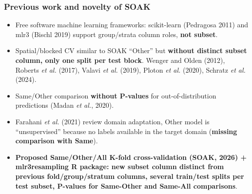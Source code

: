 \documentclass[t,aspectratio=1610]{beamer}
\begin{document}
\begin{frame}
  \frametitle{Previous work and novelty of SOAK}
  \begin{itemize}
  \item Free software machine learning frameworks: scikit-learn (Pedragosa 2011) and mlr3 (Bischl 2019) support group/strata column roles, \textbf{not subset}.
  \item Spatial/blocked CV similar to SOAK ``Other'' but \textbf{without distinct subset column, only one split per test block}.
    Wenger and Olden (2012), Roberts \emph{et al.} (2017), Valavi \emph{et al.} (2019), Ploton \emph{et al.} (2020), Schratz \emph{et al.} (2024).
  \item Same/Other comparison \textbf{without P-values} for
    out-of-distribution predictions 
    (Madan \emph{et al.}, 2020).
  \item Farahani \emph{et al.} (2021) review domain
      adaptation,
      Other model is ``unsupervised'' because no labels available in the target domain (\textbf{missing comparison with Same}).
  \item \textbf{Proposed Same/Other/All K-fold cross-validation (SOAK, 2026)  + mlr3resampling R package: new subset column distinct from previous fold/group/stratum columns, several train/test splits per test subset, P-values for Same-Other and Same-All comparisons}.
  \end{itemize}
\end{frame}
\end{document}
